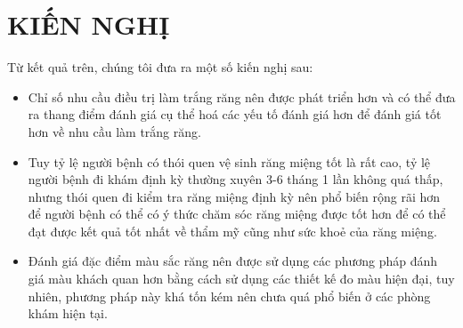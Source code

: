 \chapter*{KIẾN NGHỊ}
\vspace{5pt}
\qquad Từ kết quả trên, chúng tôi đưa ra một số kiến nghị sau:\par 
\begin{itemize}
\setlength{\itemsep}{0pt}
    \item Chỉ số nhu cầu điều trị làm trắng răng nên được phát triển hơn và có thể đưa ra thang điểm đánh giá cụ thể hoá các yếu tố đánh giá hơn để đánh giá tốt hơn về nhu cầu làm trắng răng.
    \item Tuy tỷ lệ người bệnh có thói quen vệ sinh răng miệng tốt là rất cao, tỷ lệ người bệnh đi khám định kỳ thường xuyên 3-6 tháng 1 lần không quá thấp, nhưng thói quen đi kiểm tra răng miệng định kỳ nên phổ biến rộng rãi hơn để người bệnh có thể có ý thức chăm sóc răng miệng được tốt hơn để có thể đạt được kết quả tốt nhất về thẩm mỹ cũng như sức khoẻ của răng miệng. 
    \item Đánh giá đặc điểm màu sắc răng nên được sử dụng các phương pháp đánh giá màu khách quan hơn bằng cách sử dụng các thiết kế đo màu hiện đại, tuy nhiên, phương pháp này khá tốn kém nên chưa quá phổ biến ở các phòng khám hiện tại.
\end{itemize}

